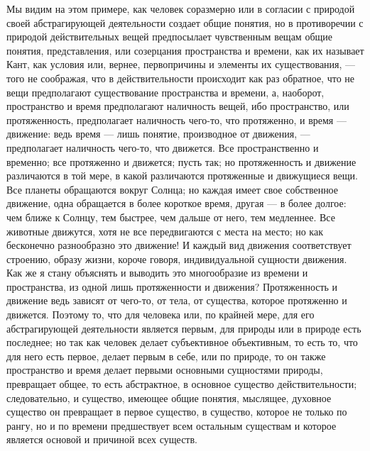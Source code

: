 \documentclass[12pt]{article}
\begin{document}
Мы видим на этом примере, как человек соразмерно или в согласии с природой своей абстрагирующей деятельности создает общие понятия, но в противоречии с природой действительных вещей предпосылает чувственным вещам общие понятия, представления, или созерцания пространства и времени, как их называет Кант, как условия или, вернее, первопричины и элементы их существования, --- того не соображая, что в действительности происходит как раз обратное, что не вещи предполагают существование пространства и времени, а, наоборот, пространство и время предполагают наличность вещей, ибо пространство, или протяженность, предполагает наличность чего-то, что протяженно, и время --- движение: ведь время --- лишь понятие, производное от движения, --- предполагает наличность чего-то, что движется. Все пространственно и временно; все протяженно и движется; пусть так; но протяженность и движение различаются в той мере, в какой различаются протяженные и движущиеся вещи. Все планеты обращаются вокруг Солнца; но каждая имеет свое собственное движение, одна обращается в более короткое время, другая --- в более долгое: чем ближе к Солнцу, тем быстрее, чем дальше от него, тем медленнее. Все животные движутся, хотя не все передвигаются с места на место; но как бесконечно разнообразно это движение! И каждый вид движения соответствует строению, образу жизни, короче говоря, индивидуальной сущности движения. Как же я стану объяснять и выводить это многообразие из времени и пространства, из одной лишь протяженности и движения? Протяженность и движение ведь зависят от чего-то, от тела, от существа, которое протяженно и движется. Поэтому то, что для человека или, по крайней мере, для его абстрагирующей деятельности является первым, для природы или в природе есть последнее; но так как человек делает субъективное объективным, то есть то, что для него есть первое, делает первым в себе, или по природе, то он также пространство и время делает первыми основными сущностями природы, превращает общее, то есть абстрактное, в основное существо действительности; следовательно, и существо, имеющее общие понятия, мыслящее, духовное существо он превращает в первое существо, в существо, которое не только по рангу, но и по времени предшествует всем остальным существам и которое является основой и причиной всех существ. 
\end{document}

